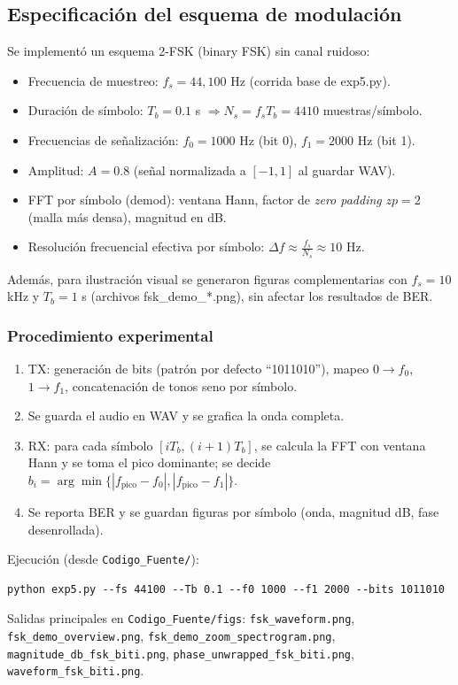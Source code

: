 \documentclass[letter,12pt]{article}
\begin{document}
\subsection{Especificación del esquema de modulación}
Se implementó un esquema 2-FSK (binary FSK) sin canal ruidoso:
\begin{itemize}
  \item Frecuencia de muestreo: \(f_s = 44{,}100\) Hz (corrida base de exp5.py).
  \item Duración de símbolo: \(T_b = 0.1\) s \(\Rightarrow N_s = f_s T_b = 4410\) muestras/símbolo.
  \item Frecuencias de señalización: \(f_0 = 1000\) Hz (bit 0), \(f_1 = 2000\) Hz (bit 1).
  \item Amplitud: \(A=0.8\) (señal normalizada a \([-1,1]\) al guardar WAV).
  \item FFT por símbolo (demod): ventana Hann, factor de \emph{zero padding} \(zp=2\) (malla más densa), magnitud en dB.
  \item Resolución frecuencial efectiva por símbolo: \(\Delta f \approx \frac{f_s}{N_s} \approx 10\) Hz.
\end{itemize}
Además, para ilustración visual se generaron figuras complementarias con \(f_s=10\) kHz y \(T_b=1\) s (archivos fsk\_demo\_*.png), sin afectar los resultados de BER.

\subsubsection{Procedimiento experimental}
\begin{enumerate}
  \item TX: generación de bits (patrón por defecto ``1011010''), mapeo \(0\to f_0\), \(1\to f_1\), concatenación de tonos seno por símbolo.
  \item Se guarda el audio en WAV y se grafica la onda completa.
  \item RX: para cada símbolo \([iT_b,(i+1)T_b]\), se calcula la FFT con ventana Hann y se toma el pico dominante; se decide \(b_i=\arg\min\{|f_{\text{pico}}-f_0|,|f_{\text{pico}}-f_1|\}\).
  \item Se reporta BER y se guardan figuras por símbolo (onda, magnitud dB, fase desenrollada).
\end{enumerate}
Ejecución (desde \texttt{Codigo\_Fuente/}):
\begin{verbatim}
python exp5.py --fs 44100 --Tb 0.1 --f0 1000 --f1 2000 --bits 1011010
\end{verbatim}
Salidas principales en \texttt{Codigo\_Fuente/figs}: 
\texttt{fsk\_waveform.png}, \texttt{fsk\_demo\_overview.png}, 
\texttt{fsk\_demo\_zoom\_spectrogram.png}, 
\texttt{magnitude\_db\_fsk\_bit{i}.png}, 
\texttt{phase\_unwrapped\_fsk\_bit{i}.png}, 
\texttt{waveform\_fsk\_bit{i}.png}.
\end{document}
